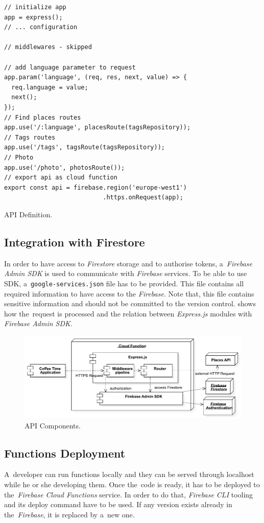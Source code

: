 \begin{listing}[ht]
\begin{verbatim}
// initialize app
app = express();
// ... configuration

// middlewares - skipped

// add language parameter to request
app.param('language', (req, res, next, value) => {
  req.language = value;
  next();
});
// Find places routes
app.use('/:language', placesRoute(tagsRepository));
// Tags routes
app.use('/tags', tagsRoute(tagsRepository));
// Photo
app.use('/photo', photosRoute());
// export api as cloud function
export const api = firebase.region('europe-west1')
                           .https.onRequest(app);
\end{verbatim}
\caption{API Definition.}
\label{listing:cta-index}
\end{listing}

\subsection{Integration with Firestore}
In order to have access to \textit{Firestore} storage and to authorise tokens, a~\textit{Firebase Admin SDK} is used to communicate with \textit{Firebase} services. To be able to use SDK, a~\verb|google-services.json| file has to be provided. This file contains all required information to have access to the \textit{Firebase}. Note that, this file contains sensitive information and should not be committed to the version control.  shows how the~request is processed and the relation between \textit{Express.js} modules with \textit{Firebase Admin SDK}.

\begin{figure}[ht]
    \centering
    \includegraphics[width=\linewidth]{img/implementation/coffee-api-components.pdf}
    \caption{API Components.}
    \label{fig:cta-relations}
\end{figure}

\subsection{Functions Deployment}
A~developer can run functions locally and they can be served through localhost while he or she developing them. Once the~code is ready, it has to be deployed to the~\textit{Firebase Cloud Functions} service. In order to do that, \textit{Firebase CLI} tooling and its deploy command have to be used. If any version exists already in the~\textit{Firebase}, it is replaced by a~new one.

